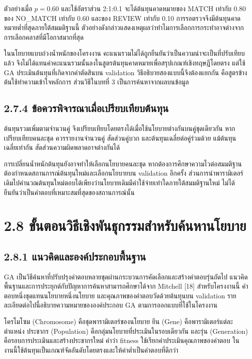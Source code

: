 \documentclass[12pt,a4paper]{report}
\begin{document}
ตัวอย่างเมื่อ $p=0.60$ และใช้อัตราส่วน 2:1:0.1 จะได้ต้นทุนคาดหมายของ MATCH เท่ากับ 0.80 ของ NO\_MATCH เท่ากับ 0.60 และของ REVIEW เท่ากับ 0.10 การรอตรวจจึงมีต้นทุนคาดหมายต่ำที่สุดภายใต้สมมติฐานนี้ ตัวอย่างดังกล่าวแสดงเหตุผลว่าทำไมการเลือกการกระทำอาจต่างจากการเลือกคลาสที่มีโอกาสมากที่สุด

ในนโยบายแบบถ่วงน้ำหนักของโครงงาน คะแนนรวมไม่ได้ถูกยืนยันว่าเป็นความน่าจะเป็นที่ปรับเทียบแล้ว จึงไม่ได้แทนค่าคะแนนรวมนั้นลงในสูตรต้นทุนคาดหมายเพื่อสรุปเกณฑ์เชิงทฤษฎีโดยตรง แต่ใช้ GA ประเมินต้นทุนที่เกิดจากคำตัดสินบน validation วิธีอธิบายสองแบบนี้จึงต้องแยกกัน คือสูตรข้างต้นใช้ทำความเข้าใจหลักการ ส่วนวิธีในบทที่ 3 เป็นการค้นหาจากผลบนข้อมูล

\subsection*{2.7.4 ข้อควรพิจารณาเมื่อเปรียบเทียบต้นทุน}
ต้นทุนรวมเพิ่มตามจำนวนคู่ จึงเปรียบเทียบโดยตรงได้เมื่อใช้นโยบายต่างกันบนคู่ชุดเดียวกัน หากเปรียบเทียบคนละชุด ควรรายงานจำนวนคู่ สัดส่วนคู่บวก และต้นทุนเฉลี่ยต่อคู่ร่วมด้วย แม้ต้นทุนเฉลี่ยเท่ากัน สัดส่วนความผิดพลาดอาจต่างกันได้

การเปลี่ยนน้ำหนักต้นทุนยังอาจทำให้เลือกนโยบายคนละชุด หากต้องการศึกษาความไวต่อสมมติฐาน ต้องกำหนดสถานการณ์ต้นทุนใหม่และเลือกนโยบายบน validation อีกครั้ง ส่วนการนำพารามิเตอร์เดิมไปคำนวณต้นทุนใหม่ตอบได้เพียงว่านโยบายเดิมมีค่าใช้จ่ายเท่าใดภายใต้สมมติฐานใหม่ ไม่ได้ยืนยันว่าเป็นคำตอบที่เหมาะสมที่สุดของสถานการณ์นั้น

\section*{2.8 ขั้นตอนวิธีเชิงพันธุกรรมสำหรับค้นหานโยบาย}
\subsection*{2.8.1 แนวคิดและองค์ประกอบพื้นฐาน}
GA เป็นวิธีค้นหาที่ปรับปรุงคำตอบหลายชุดผ่านกระบวนการคัดเลือกและสร้างคำตอบรุ่นถัดไป แนวคิดพื้นฐานและการประยุกต์กับปัญหาการค้นหาสามารถศึกษาได้จาก Mitchell [18] สำหรับโครงงานนี้ คำตอบหนึ่งชุดแทนนโยบายหนึ่งนโยบาย และคุณภาพของคำตอบวัดด้วยต้นทุนบน validation รายละเอียดต่อไปนี้อธิบายความหมายขององค์ประกอบ GA ตามการออกแบบที่ใช้ในโครงงาน

โครโมโซม (Chromosome) คือชุดพารามิเตอร์ของนโยบาย ยีน (Gene) คือพารามิเตอร์แต่ละตำแหน่ง ประชากร (Population) คือกลุ่มนโยบายที่ประเมินในรอบเดียวกัน และรุ่น (Generation) คือรอบการประเมินและสร้างประชากรใหม่ คำว่า fitness ใช้เรียกค่าประเมินคุณภาพของคำตอบ ในงานนี้ใช้ต้นทุนเป็นเกณฑ์จัดอันดับโดยตรงและให้ค่าต่ำเป็นคำตอบที่ดีกว่า
\end{document}

